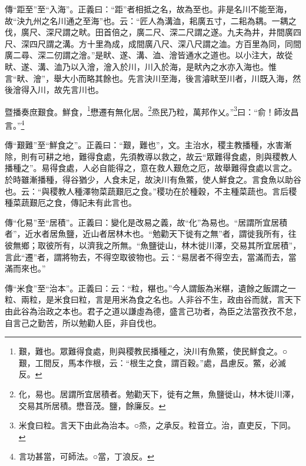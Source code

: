 {\noindent\zhuan{}\fzbyks 傳“距至”至“入海”。正義曰：“距”者相抵之名，故為至也。非是名川不能至海，故“決九州之名川通之至海”也。云：“匠人為溝洫，耜廣五寸，二耜為耦。一耦之伐，廣尺、深尺謂之畎。田首倍之，廣二尺、深二尺謂之遂。九夫為井，井間廣四尺、深四尺謂之溝。方十里為成，成間廣八尺、深八尺謂之洫。方百里為同，同間廣二尋、深二仞謂之澮。”是畎、遂、溝、洫、澮皆通水之道也。以小注大，故從畎、遂、溝、洫乃以入澮，澮入於川，川入於海，是畎內之水亦入海也。惟言“畎、澮”，舉大小而略其餘也。先言決川至海，後言濬畎至川者，川既入海，然後澮得入川，故先言川也。 \par}

暨播奏庶艱食。鮮食，\footnote{艱，難也。眾難得食處，則與稷教民播種之，決川有魚鱉，使民鮮食之。○艱，工間反，馬本作根，云：“根生之食，謂百穀。”處，昌慮反。鱉，必滅反。}懋遷有無化居。\footnote{化，易也。居謂所宜居積者。勉勸天下，徙有之無，魚鹽徙山，林木徙川澤，交易其所居積。懋音茂。鹽，餘廉反。}烝民乃粒，萬邦作乂。”\footnote{米食曰粒。言天下由此為治本。○烝，之承反。粒音立。治，直吏反，下同。}曰：“俞！師汝昌言。”\footnote{言功甚當，可師法。○當，丁浪反。}

{\noindent\zhuan{}\fzbyks 傳“艱難”至“鮮食之”。正義曰：“艱，難也”，文。主治水，稷主教播種，水害漸除，則有可耕之地，難得食處，先須教導以救之，故云“眾難得食處，則與稷教人播種之”。易得食處，人必自能得之，意在救人艱危之厄，故舉難得食處以言之。於時雖漸播種，得谷猶少，人食未足，故決川有魚鱉，使人鮮食之。言食魚以助谷也。云：“與稷教人種澤物菜蔬艱厄之食。”稷功在於種穀，不主種菜蔬也。言后稷種菜蔬艱厄之食，傳記未有此言也。 \par}

{\noindent\zhuan{}\fzbyks 傳“化易”至“居積”。正義曰：變化是改易之義，故“化”為易也。“居謂所宜居積者”，近水者居魚鹽，近山者居林木也。“勉勸天下徙有之無”者，謂徙我所有，往彼無鄉；取彼所有，以濟我之所無。“魚鹽徙山，林木徙川澤，交易其所宜居積”，言此“遷”者，謂將物去，不得空取彼物也。云：“易居者不得空去，當滿而去，當滿而來也。” \par}

{\noindent\zhuan{}\fzbyks 傳“米食”至“治本”。正義曰：云：“粒，糂也。”今人謂飯為米糂，遺餘之飯謂之一粒、兩粒，是米食曰粒，言是用米為食之名也。人非谷不生，政由谷而就，言天下由此谷為治政之本也。君子之道以謙虛為德，盛言己功者，為臣之法當孜孜不怠，自言己之勤苦，所以勉勸人臣，非自伐也。 \par}

